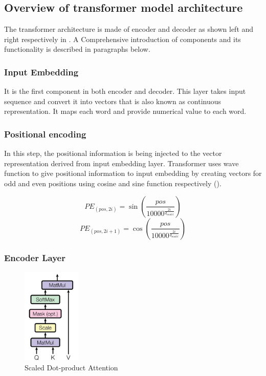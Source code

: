 \subsection{Overview of transformer model architecture}

The transformer architecture is made of encoder and decoder as shown left and right respectively in . A Comprehensive introduction of components and its functionality is described in paragraphs below.

\subsubsection{Input Embedding}
It is the first component in both encoder and decoder. This layer takes input sequence and convert it into vectors that is also known as continuous representation. It maps each word  and provide numerical value to each word.

\subsubsection{Positional encoding}
In this step, the positional information is being injected to the vector representation derived from input embedding layer. Transformer uses wave function to give positional information to input embedding by creating vectors for odd and even positions using cosine and sine function respectively ().

\begin{equation}
    \label{eq:Wave_functions}
    PE_{(pos, 2i)} = \sin{\left(\frac{pos}{10000^\frac{2i}{d_{model}}}\right)}
\end{equation}
\[PE_{(pos, 2i+1)} = \cos{\left(\frac{pos}{10000^\frac{2i}{d_{model}}}\right)} \]

\subsubsection{Encoder Layer}


\begin{figure}[ht]
    \centering
    \includegraphics[width=0.25\textwidth]{chapters/images/Transformer/Inside_Attention.JPG}
    \caption{Scaled Dot-product Attention \cite{vaswani2017attention}}
    \label{fig:Scaled_Dot-product_Attention}
\end{figure}

